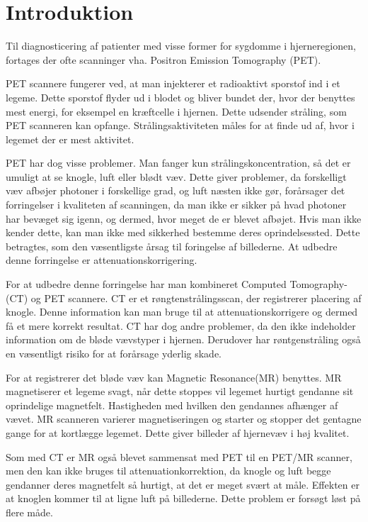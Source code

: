 \section{Introduktion}

Til diagnosticering af patienter med visse former for sygdomme i hjerneregionen, fortages der ofte scanninger vha. Positron Emission Tomography (PET). 

PET scannere fungerer ved, at man injekterer et radioaktivt sporstof
ind i et legeme. Dette sporstof flyder ud i blodet og bliver bundet
der, hvor der benyttes mest energi, for eksempel en kræftcelle i
hjernen. Dette udsender stråling, som PET scanneren kan opfange.
Strålingsaktiviteten måles for at finde ud af, hvor i legemet der er
mest aktivitet.

PET har dog visse problemer. Man fanger kun strålingskoncentration,
så det er umuligt at se knogle, luft eller blødt væv. Dette giver
problemer, da forskelligt væv afbøjer photoner i forskellige grad,
og luft næsten ikke gør, forårsager det forringelser i kvaliteten
af scanningen, da man ikke er sikker på hvad photoner har bevæget
sig igenn, og dermed, hvor meget de er blevet afbøjet. Hvis man ikke
kender dette, kan man ikke med sikkerhed bestemme deres oprindelsessted.
Dette betragtes, som den væsentligste årsag til foringelse af
billederne.\cite{vigtighedAfAttenuation} At udbedre denne forringelse er
attenuationskorrigering.

For at udbedre denne forringelse har man kombineret Computed
Tomo\-graphy- (CT) og PET scannere. CT er et røngtenstrålingsscan,
der registrerer placering af knogle. Denne information kan man bruge
til at attenuationskorrigere og dermed få et mere korrekt resultat.
CT har dog andre problemer, da den ikke indeholder information om de
bløde vævstyper i hjernen. Derudover har røntgenstråling også
en væsentligt risiko for at forårsage yderlig skade. \cite{skadeligCT}

For at registrerer det bløde væv kan Magnetic Resonance(MR) benyttes.
MR magnetiserer et legeme svagt, når dette stoppes vil legemet hurtigt
gendanne sit oprindelige magnetfelt. Hastigheden med hvilken den gendannes
afhænger af vævet. MR scanneren varierer magnetiseringen og starter og
stopper det gentagne gange for at kortlægge legemet. Dette giver billeder
af hjernevæv i høj kvalitet.

Som med CT er MR også blevet sammensat med PET til en PET/MR scanner, men
den kan ikke bruges til attenuationkorrektion, da knogle og luft begge 
gendanner deres magnetfelt så hurtigt, at det er meget svært at måle.
Effekten er at knoglen kommer til at ligne luft på billederne. Dette
problem er forsøgt løst på flere måde.

